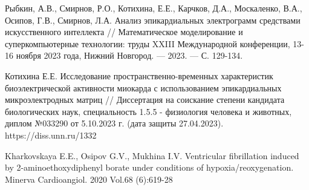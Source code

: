 \begin{thebibliography}{00}
	Рыбкин, А.В., Смирнов, Р.О., Котихина, Е.Е., Карчков, Д.А., Москаленко, В.А.,
	Осипов, Г.В., Смирнов, Л.А. Анализ эпикардиальных электрограмм средствами
	искусственного интеллекта // Математическое моделирование и суперкомпьютерные
	технологии: труды XXIII Международной конференции, 13-16 ноября 2023 года,
	Нижний Новгород. — 2023. — С. 129-134.

	Котихина Е.Е. Исследование пространственно-временных характеристик
	биоэлектрической активности миокарда с использованием эпикардиальных
	микроэлектродных матриц // Диссертация на соискание степени кандидата
	биологических наук, специальность 1.5.5 - физиология человека и животных,
	диплом №033290 от 5.10.2023 г. (дата защиты 27.04.2023).
	https://diss.unn.ru/1332

	Kharkovskaya E.E., Osipov G.V., Mukhina I.V. Ventricular fibrillation
	induced by 2-aminoethoxydiphenyl borate under conditions of
	hypoxia/reoxygenation. Minerva Cardioangiol. 2020 Vol.68 (6):619-28

\end{thebibliography}
\endgroup
